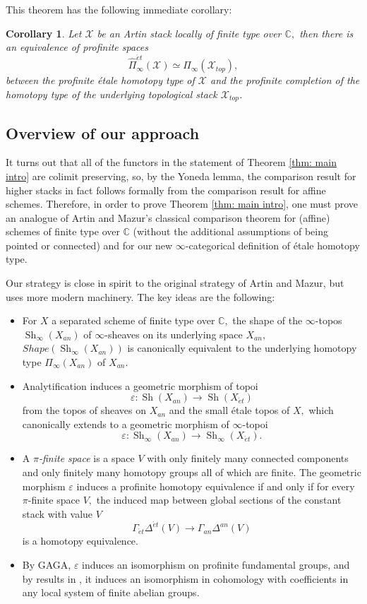 \documentclass[12pt]{amsart}
\newtheorem{corollary}[dummy]{Corollary}
\theoremstyle{definition}
\newcommand{\bC}{\mathbb{C}}
\newcommand{\cX}{\mathcal{X}}
\newcommand{\Sh}{\operatorname{Sh}}
\newcommand{\et}{\acute{e}t}
\renewcommand{\i}{\infty}
\def\Shi{\Sh_\i}
\def\Shape{\mathit{Shape}}
\begin{document}
This theorem has the following immediate corollary:

\begin{corollary}
Let $\cX$ be an Artin stack locally of finite type over $\bC,$ then there is an equivalence of profinite spaces $$\widehat{\Pi}^{\et}_\i\left(\cX\right) \simeq \widehat{\Pi}_\i\left(\cX_{top}\right),$$ between the profinite \'etale homotopy type of $\cX$ and the profinite completion of the homotopy type of the underlying topological stack $\cX_{top}$.
\end{corollary}
\subsection{Overview of our approach}
It turns out that all of the functors in the statement of Theorem \ref{thm: main intro} are colimit preserving, so, by the Yoneda lemma, the comparison result for higher stacks in fact follows formally from the comparison result for affine schemes. Therefore, in order to prove Theorem \ref{thm: main intro}, one must prove an analogue of Artin and Mazur's classical comparison theorem for (affine) schemes of finite type over $\bC$ (without the additional assumptions of being pointed or connected) and for our new $\i$-categorical definition of \'etale homotopy type.

Our strategy is close in spirit to the original strategy of Artin and Mazur, but uses more modern machinery. The key ideas are the following:

\begin{itemize}
\item[1)] For $X$ a separated scheme of finite type over $\bC,$ the shape of the $\i$-topos $\Shi\left(X_{an}\right)$ of $\i$-sheaves on its underlying space $X_{an},$ $\Shape\left(\Shi\left(X_{an}\right)\right)$ is canonically equivalent to the underlying homotopy type $\Pi_\i\left(X_{an}\right)$ of $X_{an}.$
\item[2)] Analytification induces a geometric morphism of topoi
$$\varepsilon:\Sh\left(X_{an}\right) \to \Sh\left(X_{\et}\right)$$ from the topos of sheaves on $X_{an}$ and the small \'etale topos of $X,$ which canonically extends to a geometric morphism of $\i$-topoi
$$\varepsilon:\Shi\left(X_{an}\right) \to \Shi\left(X_{\et}\right).$$
\item[3)] A \emph{$\pi$-finite space} is a space $V$ with only finitely many connected components and only finitely many homotopy groups all of which are finite. The geometric morphism $\varepsilon$ induces a profinite homotopy equivalence if and only if for every $\pi$-finite space $V,$ the induced map between global sections of the constant stack with value $V$ $$\Gamma_{\et}\Delta^{\et}\left(V\right) \to \Gamma_{an}\Delta^{an}\left(V\right)$$ is a homotopy equivalence.
\item[4)] By GAGA, $\varepsilon$ induces an isomorphism on profinite fundamental groups, and by results in \cite{SGA4}, it induces an isomorphism in cohomology with coefficients in any local system of finite abelian groups.
\end{itemize}
\end{document}

